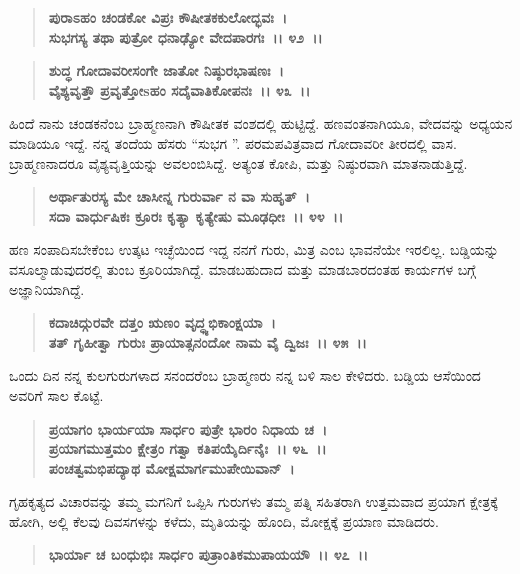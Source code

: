 \begin{verse}
\textbf{ಪುರಾಽಹಂ ಚಂಡಕೋ ವಿಪ್ರಃ ಕೌಷೀತಕಕುಲೋದ್ಭವಃ~।}\\\textbf{ಸುಭಗಸ್ಯ ತಥಾ ಪುತ್ರೋ ಧನಾಢ್ಯೋ ವೇದಪಾರಗಃ~।। ೪೨~।। }
\end{verse}

\begin{verse}
\textbf{ಶುದ್ಧ ಗೋದಾವರೀಸಂಗೇ ಜಾತೋ ನಿಷ್ಠುರಭಾಷಣಃ~।}\\\textbf{ವೈಶ್ಯವೃತ್ತೌ ಪ್ರವೃತ್ತೋsಹಂ ಸದೈವಾತಿಕೋಪನಃ~।। ೪೩~।।}
\end{verse}

ಹಿಂದೆ ನಾನು ಚಂಡಕನೆಂಬ ಬ್ರಾಹ್ಮಣನಾಗಿ ಕೌಷೀತಕ ವಂಶದಲ್ಲಿ ಹುಟ್ಟಿದ್ದೆ. ಹಣವಂತನಾಗಿಯೂ, ವೇದವನ್ನು ಅಧ್ಯಯನ ಮಾಡಿಯೂ ಇದ್ದೆ. ನನ್ನ ತಂದೆಯ ಹೆಸರು “ಸುಭಗ ”. ಪರಮಪವಿತ್ರವಾದ ಗೋದಾವರೀ ತೀರದಲ್ಲಿ ವಾಸ. ಬ್ರಾಹ್ಮಣನಾದರೂ ವೈಶ್ಯವೃತ್ತಿಯನ್ನು ಅವಲಂಬಿಸಿದ್ದೆ. ಅತ್ಯಂತ ಕೋಪಿ, ಮತ್ತು ನಿಷ್ಠುರವಾಗಿ ಮಾತನಾಡುತ್ತಿದ್ದೆ.

\begin{verse}
\textbf{ಅರ್ಥಾತುರಸ್ಯ ಮೇ ಚಾಸೀನ್ನ ಗುರುರ್ವಾ ನ ವಾ ಸುಹೃತ್~।}\\\textbf{ಸದಾ ವಾರ್ಧುಷಿಕಃ ಕ್ರೂರಃ ಕೃತ್ಯಾ ಕೃತ್ಯೇಷು ಮೂಢಧೀಃ~।। ೪೪~।।}
\end{verse}

ಹಣ ಸಂಪಾದಿಸಬೇಕೆಂಬ ಉತ್ಕಟ ಇಚ್ಛೆಯಿಂದ ಇದ್ದ ನನಗೆ ಗುರು, ಮಿತ್ರ ಎಂಬ ಭಾವನೆಯೇ ಇರಲಿಲ್ಲ. ಬಡ್ಡಿಯನ್ನು ವಸೂಲ್ಮಾಡುವುದರಲ್ಲಿ ತುಂಬ ಕ್ರೂರಿಯಾಗಿದ್ದೆ. ಮಾಡಬಹುದಾದ ಮತ್ತು ಮಾಡಬಾರದಂತಹ ಕಾರ್ಯಗಳ ಬಗ್ಗೆ ಅಜ್ಞಾನಿಯಾಗಿದ್ದೆ.

\begin{verse}
\textbf{ಕದಾಚಿದ್ಗುರವೇ ದತ್ತಂ ಋಣಂ ವೃದ್ಧ್ಯಭಿಕಾಂಕ್ಷಯಾ~।}\\\textbf{ತತ್ ಗೃಹೀತ್ವಾ ಗುರುಃ ಪ್ರಾಯಾತ್ಸನಂದೋ ನಾಮ ವೈ ದ್ವಿಜಃ~।। ೪೫~।।}
\end{verse}

ಒಂದು ದಿನ ನನ್ನ ಕುಲಗುರುಗಳಾದ ಸನಂದರೆಂಬ ಬ್ರಾಹ್ಮಣರು ನನ್ನ ಬಳಿ ಸಾಲ ಕೇಳಿದರು. ಬಡ್ಡಿಯ ಆಸೆಯಿಂದ ಅವರಿಗೆ ಸಾಲ ಕೊಟ್ಟೆ.

\begin{verse}
\textbf{ಪ್ರಯಾಗಂ ಭಾರ್ಯಯಾ ಸಾರ್ಧಂ ಪುತ್ರೇ ಭಾರಂ ನಿಧಾಯ ಚ~।}\\\textbf{ಪ್ರಯಾಗಮುತ್ತಮಂ ಕ್ಷೇತ್ರಂ ಗತ್ವಾ ಕತಿಪಯೈರ್ದಿನೈಃ~।। ೪೬~।। }\\\textbf{ಪಂಚತ್ವಮಭಿಪದ್ಯಾಥ ಮೋಕ್ಷಮಾರ್ಗಮುಪೇಯಿವಾನ್~।}
\end{verse}

ಗೃಹಕೃತ್ಯದ ವಿಚಾರವನ್ನು ತಮ್ಮ ಮಗನಿಗೆ ಒಪ್ಪಿಸಿ ಗುರುಗಳು ತಮ್ಮ ಪತ್ನಿ ಸಹಿತರಾಗಿ ಉತ್ತಮವಾದ ಪ್ರಯಾಗ ಕ್ಷೇತ್ರಕ್ಕೆ ಹೋಗಿ, ಅಲ್ಲಿ ಕೆಲವು ದಿವಸಗಳನ್ನು ಕಳೆದು, ಮೃತಿಯನ್ನು ಹೊಂದಿ, ಮೋಕ್ಷಕ್ಕೆ ಪ್ರಯಾಣ ಮಾಡಿದರು.

\begin{verse}
\textbf{ಭಾರ್ಯಾ ಚ ಬಂಧುಭಿಃ ಸಾರ್ಧಂ ಪುತ್ರಾಂತಿಕಮುಪಾಯಯೌ~।। ೪೭~।।}
\end{verse}

